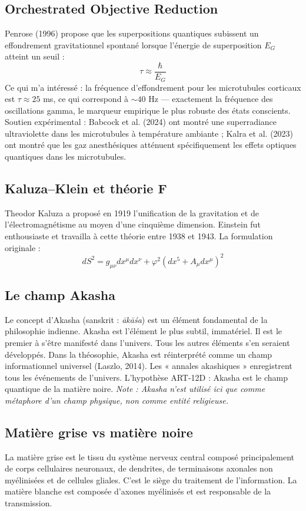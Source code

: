 \documentclass[11pt,a4paper]{article}
\begin{document}
\subsection{Orchestrated Objective Reduction}
Penrose (1996) propose que les superpositions quantiques subissent un effondrement gravitationnel spontané lorsque l'énergie de superposition $E_G$ atteint un seuil :
\begin{equation}
\tau \approx \frac{\hbar}{E_G}
\end{equation}
Ce qui m'a intéressé : la fréquence d'effondrement pour les microtubules corticaux est $\tau \approx 25$ ms, ce qui correspond à $\sim 40$ Hz --- exactement la fréquence des oscillations gamma, le marqueur empirique le plus robuste des états conscients. Soutien expérimental : Babcock et al. (2024) ont montré une superradiance ultraviolette dans les microtubules à température ambiante ; Kalra et al. (2023) ont montré que les gaz anesthésiques atténuent spécifiquement les effets optiques quantiques dans les microtubules.

\subsection{Kaluza--Klein et théorie F}
Theodor Kaluza a proposé en 1919 l'unification de la gravitation et de l'électromagnétisme au moyen d'une cinquième dimension. Einstein fut enthousiaste et travailla à cette théorie entre 1938 et 1943. La formulation originale :
\begin{equation}
dS^2 = g_{\mu\nu} dx^\mu dx^\nu + \varphi^2(dx^5 + A_{\mu} dx^\mu)^2
\end{equation}

\subsection{Le champ Akasha}
Le concept d'Akasha (sanskrit : \emph{ākāśa}) est un élément fondamental de la philosophie indienne. Akasha est l'élément le plus subtil, immatériel. Il est le premier à s'être manifesté dans l'univers. Tous les autres éléments s'en seraient développés. Dans la théosophie, Akasha est réinterprété comme un champ informationnel universel (Laszlo, 2014). Les « annales akashiques » enregistrent tous les événements de l'univers. L'hypothèse ART-12D : Akasha est le champ quantique de la matière noire. \textit{Note : Akasha n'est utilisé ici que comme métaphore d'un champ physique, non comme entité religieuse.}

\subsection{Matière grise vs matière noire}
La matière grise est le tissu du système nerveux central composé principalement de corps cellulaires neuronaux, de dendrites, de terminaisons axonales non myélinisées et de cellules gliales. C'est le siège du traitement de l'information. La matière blanche est composée d'axones myélinisés et est responsable de la transmission.
\end{document}
